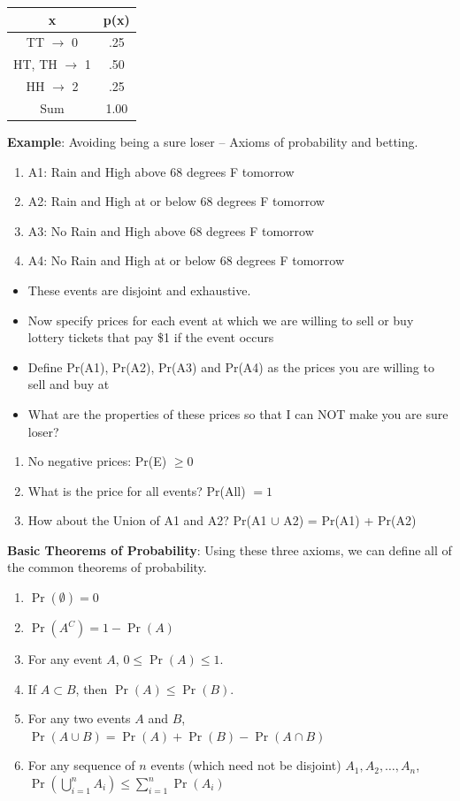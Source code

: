 \documentclass[20pt]{extarticle}
\newcommand{\bi}{\begin{itemize}}
\newcommand{\ei}{\end{itemize}}
\newcommand{\be}{\begin{enumerate}}
\newcommand{\ee}{\end{enumerate}}
\begin{document}
\begin{center}
\begin{tabular}{c | c}
\hline
x & p(x) \\
\hline
{TT} $\rightarrow$ 0 & .25 \\
{HT, TH} $\rightarrow$ 1 & .50 \\
{HH} $\rightarrow$ 2 & .25\\
\hline
Sum & 1.00 \\
\hline
\end{tabular}
\end{center}

\item {\bf Example}: Avoiding being a sure loser -- Axioms of probability and betting.
\be
\item A1: Rain and High above 68 degrees F tomorrow
\item A2: Rain and High at or below 68 degrees F tomorrow
\item A3: No Rain and High above 68 degrees F tomorrow
\item A4: No Rain and High at or below 68 degrees F tomorrow
\ee
\bi
\item These events are disjoint and exhaustive. 
\item Now specify prices for each event at which we are willing to sell or buy lottery tickets that pay \$1 if the event occurs
\item Define Pr(A1), Pr(A2), Pr(A3) and Pr(A4) as the prices you are willing to sell and buy at
\item What are the properties of these prices so that I can NOT make you are sure loser?
\ei
\be
\item No negative prices: Pr(E) $\geq 0$
\item What is the price for all events? Pr(All) $=1$
\item How about the Union of A1 and A2? Pr(A1 $\cup$ A2) = Pr(A1) + Pr(A2)
\ee


\item {\bf Basic Theorems of Probability}: Using these three axioms,
  we can define all of the common theorems of probability.  \be
  \item $\Pr(\emptyset)=0$
  \item $\Pr({A}^C)=1-\Pr(A)$
  \item For any event $A$, $0\le \Pr(A) \le 1$.
  \item If $A\subset B$, then $\Pr(A)\le \Pr(B)$.
  \item For any two events $A$ and $B$, $\Pr(A\cup
B)=\Pr(A)+\Pr(B)-\Pr(A\cap B)$
  \item For any sequence of $n$ events (which need not be disjoint)
$A_1,A_2,\ldots,A_n$,\\
$\Pr\left( \bigcup\limits_{i=1}^n
A_i\right) \leq \sum\limits_{i=1}^n \Pr(A_i)$
  \ee
\end{document}
